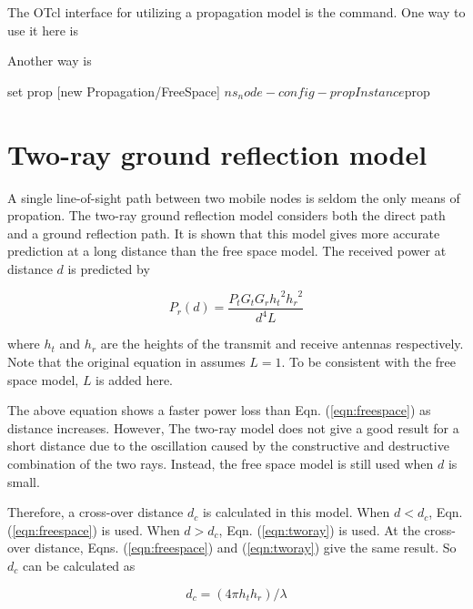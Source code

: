 The OTcl interface for utilizing a propagation model is the 
command. One way to use it here is


Another way is

\begin{program}
set prop [new Propagation/FreeSpace]
$ns_ node-config -propInstance $prop
\end{program}

\section{Two-ray ground reflection model}
\label{sec:tworay}

A single line-of-sight path between two mobile nodes is seldom the only means
of propation. The two-ray ground reflection model considers both the direct
path and a ground reflection path. It is shown \cite{Rappaport96} that this
model gives more accurate prediction at a long distance than the free space
model. The received power at distance $d$ is predicted by

\begin{equation}
  P_r (d) = \frac{P_t G_t G_r {h_t}^2 {h_r}^2}{d^4 L}
  \label{eqn:tworay}
\end{equation}

where $h_t$ and $h_r$ are the heights of the transmit and receive antennas
respectively. Note that the original equation in \cite{Rappaport96} assumes
$L = 1$. To be consistent with the free space model, $L$ is added here.

The above equation shows a faster power loss than Eqn. (\ref{eqn:freespace})
as distance increases. However, The two-ray model does not give a good result
for a short distance due to the oscillation caused by the constructive and
destructive combination of the two rays. Instead, the free space model is
still used when $d$ is small.

Therefore, a cross-over distance $d_c$ is calculated in this model. When
$d < d_c$, Eqn. (\ref{eqn:freespace}) is used. When $d > d_c$, Eqn.
(\ref{eqn:tworay}) is used. At the cross-over distance, Eqns. (\ref{eqn:freespace})
and (\ref{eqn:tworay}) give the same result. So $d_c$ can be calculated as

\begin{equation}
  d_c = \left( 4\pi h_t h_r \right) / \lambda
  \label{eqn:crossover}
\end{equation}

